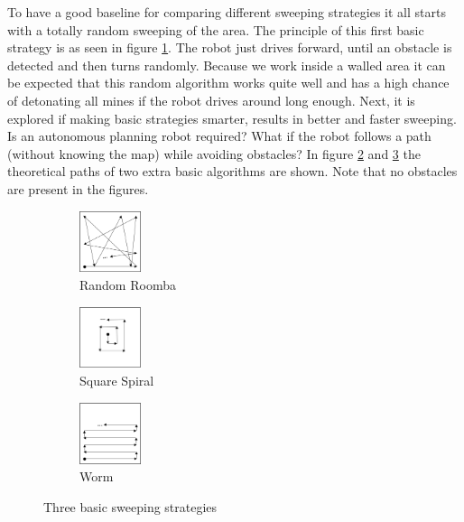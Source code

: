 \documentclass[conference]{IEEEtran}
\begin{document}
To have a good baseline for comparing different sweeping strategies it all starts with a totally random sweeping of the area. The principle of this first basic strategy is as seen in figure \ref{fig:Dumb-RandomRoomba}. The robot just drives forward, until an obstacle is detected and then turns randomly. Because we work inside a walled area it can be expected that this random algorithm works quite well and has a high chance of detonating all mines if the robot drives around long enough. Next, it is explored if making basic strategies smarter, results in better and faster sweeping. Is an autonomous planning robot required? What if the robot follows a path (without knowing the map) while avoiding obstacles? In figure \ref{fig:Dumb_SquareSpiral} and \ref{fig:Dumb_Worm} the theoretical paths of two extra basic algorithms are shown. Note that no obstacles are present in the figures. 

\begin{figure}[htbp]
     \centering
     \begin{subfigure}[b]{27mm}
         \centering
         \includegraphics[width=18mm]{Dumb_RandomRoomba.png}
         \caption{Random Roomba}
         \label{fig:Dumb-RandomRoomba}
     \end{subfigure}
     \begin{subfigure}[b]{27mm}
         \centering
         \includegraphics[width=18mm]{Dumb_SquareSpiral.png}
         \caption{Square Spiral}
         \label{fig:Dumb_SquareSpiral}
     \end{subfigure}
     \begin{subfigure}[b]{27mm}
         \centering
         \includegraphics[width=18mm]{Dumb_Worm.png}
         \caption{Worm}
         \label{fig:Dumb_Worm}
     \end{subfigure}
        \caption{Three basic sweeping strategies}
        \label{fig:three graphs}
\end{figure}
\end{document}
